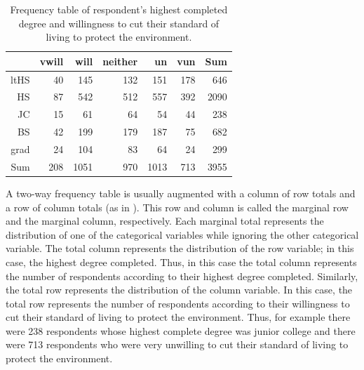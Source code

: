 \documentclass[10pt,openany]{book}\usepackage[]{graphicx}\usepackage[]{color}
\begin{document}
\begin{table}[ht]
\centering
\caption{Frequency table of respondent's highest completed degree and willingness to cut their standard of living to protect the environment.} 
\label{tab:EnvFreq}
\begin{tabular}{rrrrrrr}
  \hline
 & vwill & will & neither & un & vun & Sum \\ 
  \hline
ltHS & 40 & 145 & 132 & 151 & 178 & 646 \\ 
  HS & 87 & 542 & 512 & 557 & 392 & 2090 \\ 
  JC & 15 & 61 & 64 & 54 & 44 & 238 \\ 
  BS & 42 & 199 & 179 & 187 & 75 & 682 \\ 
  grad & 24 & 104 & 83 & 64 & 24 & 299 \\ 
  Sum & 208 & 1051 & 970 & 1013 & 713 & 3955 \\ 
   \hline
\end{tabular}
\end{table}


A two-way frequency table is usually augmented with a column of row totals and a row of column totals (as in ).  This row and column is called the marginal row and the marginal column, respectively.  Each marginal total represents the distribution of one of the categorical variables while ignoring the other categorical variable.  The total column represents the distribution of the row variable; in this case, the highest degree completed.  Thus, in this case the total column represents the number of respondents according to their highest degree completed.  Similarly, the total row represents the distribution of the column variable.  In this case, the total row represents the number of respondents according to their willingness to cut their standard of living to protect the environment.  Thus, for example there were 238 respondents whose highest complete degree was junior college and there were 713 respondents who were very unwilling to cut their standard of living to protect the environment.
\end{document}
